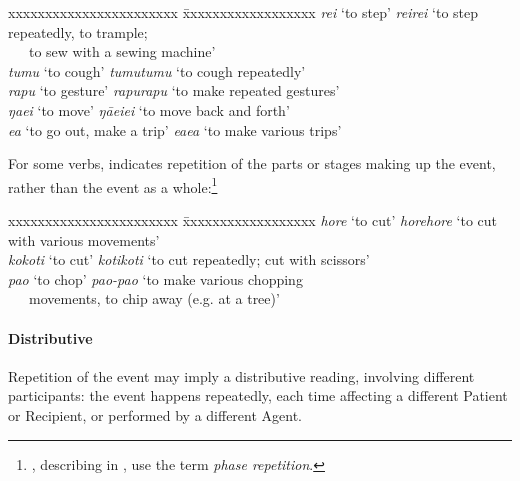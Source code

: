 \ea
\begin{tabbing}
 xxxxxxxxxxxxxxxxxxxxxxx \= xxxxxxxxxxxxxxxxxx\kill
\textit{rei} ‘to step’ \> \textit{reirei} ‘to step repeatedly, to trample; \\
\> ~~~to sew with a sewing machine’\\
  \textit{tumu} ‘to cough’ \>   \textit{tumutumu} ‘to cough repeatedly’\\
  \textit{rapu} ‘to gesture’  \>  \textit{rapurapu} ‘to make repeated gestures’\\
  \textit{ŋae{\ꞌ}i} ‘to move’  \>  \textit{ŋāe{\ꞌ}ie{\ꞌ}i} ‘to move back and forth’\\
  \textit{e{\ꞌ}a} ‘to go out, make a trip’  \>  \textit{e{\ꞌ}ae{\ꞌ}a} ‘to make various trips’  
\end{tabbing}
\z 
For some verbs,  indicates repetition of the parts or stages making up the event, rather than the event as a whole:\footnote{\label{fn:84}\citet{Haji-AbdolhosseiniMassam2002}, describing  in , use the term \textit{phase repetition}.}

\ea
\begin{tabbing}
 xxxxxxxxxxxxxxxxxxxxxxx \= xxxxxxxxxxxxxxxxxx\kill
  \textit{hore} ‘to cut’  \>  \textit{horehore} ‘to cut with various movements’\\
  \textit{kokoti} ‘to cut’   \> \textit{kotikoti} ‘to cut repeatedly; cut with scissors’\\
  \textit{pa{\ꞌ}o} ‘to chop’  \>  \textit{pa{\ꞌ}o\nobreakdash-pa{\ꞌ}o} ‘to make various chopping \\
 \> ~~~movements, to chip away (e.g. at a tree)’
\end{tabbing}
\z 
\paragraph{Distributive}\label{sec:2.6.2.2.2} Repetition of the event may imply a distributive reading, involving different participants: the event happens repeatedly, each time affecting a different Patient or Recipient, or performed by a different Agent.

